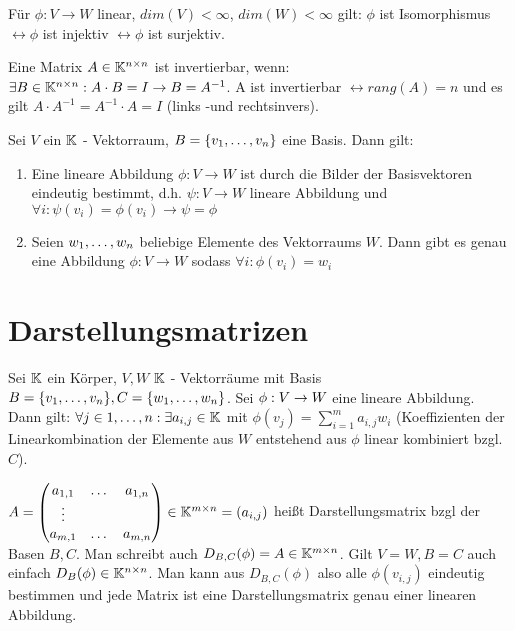 Für $\phi : V \rightarrow W$ linear, $dim(V) < \infty$, $dim(W) < \infty$ gilt: $\phi$ ist Isomorphismus $\leftrightarrow \phi$ ist injektiv $\leftrightarrow \phi$ ist surjektiv.

\begin{satz}
	Eine Matrix $A \in \mathbb{K}^{n \times n}$ ist invertierbar, wenn: $\exists B \in \mathbb{K}^{n \times n} : A \cdot B = I \rightarrow B = A^{-1}$.  A ist invertierbar $\leftrightarrow rang(A) = n$ und es gilt $A \cdot A^{-1} = A^{-1} \cdot A = I$ (links -und rechtsinvers).
\end{satz}

\begin{satz}
	Sei $V$ ein $\mathbb{K}$ - Vektorraum, $B = \{v_1, \dots, v_n\}$ eine Basis. Dann gilt:
	\begin{enumerate}[noitemsep]
		\item Eine lineare Abbildung $\phi : V \rightarrow W$ ist durch die Bilder der Basisvektoren eindeutig bestimmt, d.h. $\psi : V \rightarrow W$ lineare Abbildung und  $\forall i : \psi(v_i) = \phi(v_i) \rightarrow \psi = \phi $
		\item Seien $w_1, \dots, w_n$ beliebige Elemente des Vektorraums $W$. Dann gibt es genau eine Abbildung $\phi : V \rightarrow W$ sodass $\forall i : \phi(v_i) = w_i$
	\end{enumerate} 
\end{satz}

\pagebreak

\section{Darstellungsmatrizen}

\begin{definition}[Darstellungsmatrix]
	Sei $\mathbb{K}$ ein Körper, $V,W$ $\mathbb{K}$ - Vektorräume mit Basis $B = \{v_1, \dots, v_n\}, C = \{w_1, \dots, w_n\}$. Sei $\phi : V \rightarrow W$ eine lineare Abbildung.
	Dann gilt: $\forall j \in 1, \dots , n: \exists a_{i,j} \in \mathbb{K}$ mit $\phi(v_j) = \sum_{i=1}^{m} a_{i,j} w_i$ (Koeffizienten der Linearkombination der Elemente aus $W$ entstehend aus $\phi$ linear kombiniert bzgl. $C$). 

	$A = \begin{pmatrix}
		a_{1,1} & \dots & a_{1,n} \\
		\vdots & & \\
		a_{m,1} & \dots & a_{m,n}
	\end{pmatrix} \in \mathbb{K}^{m \times n} = (a_{i,j})$ heißt Darstellungsmatrix bzgl der Basen $B, C$. Man schreibt auch $D_{B,C}(\phi) = A \in \mathbb{K}^{m \times n}$. Gilt $V=W, B=C$ auch einfach $D_B(\phi) \in \mathbb{K}^{n \times n}$. Man kann aus $D_{B,C}(\phi)$ also alle $\phi(v_{i,j})$ eindeutig bestimmen und jede Matrix ist eine Darstellungsmatrix genau einer linearen Abbildung.
\end{definition}

